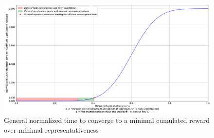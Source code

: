 \begin{figure}[h!]
    \centering
    \includegraphics[trim=0cm 0cm 0cm 0cm, clip, width=1.\linewidth]{figures/convergence_time_relative_to_representativeness.pdf}
    \caption{General normalized time to converge to a minimal cumulated reward over minimal representativeness}
    \label{fig:conv_time_repr}
\end{figure}

